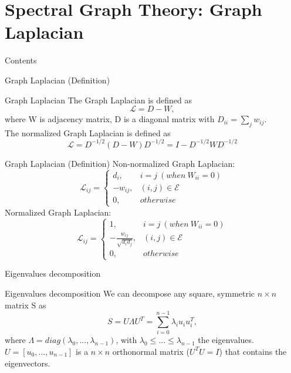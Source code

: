 \documentclass{beamer}
\begin{document}
	\section[Graph Laplacian]{Spectral Graph Theory: Graph Laplacian}
		\begin{frame}{Contents}
			\small
	\end{frame}
	\begin{frame}{Graph Laplacian (Definition)}
		\begin{block}{Graph Laplacian}
			The Graph Laplacian is defined as
			\[
			\mathcal{L}= D-W,
			\]
			where W is adjacency matrix, D is a diagonal matrix with $D_{ii} = \sum_{j}w_{ij}$. \\
			The normalized Graph Laplacian is defined as
			\[
			\mathcal{L} = D^{-1/2}(D-W)D^{-1/2} = I - D^{-1/2}WD^{-1/2}
			\]
		\end{block}
	\end{frame}
	\begin{frame}{Graph Laplacian (Definition)}
		Non-normalized Graph Laplacian:
		\begin{equation*}
			\mathcal{L}_{ij}=\begin{cases}
				d_i, & i=j\ (when\ W_{ii} = 0)\\
				-w_{ij}, & (i,j) \in \mathcal{E} \\
				0, &otherwise
			\end{cases}
		\end{equation*}
		Normalized Graph Laplacian:
		\begin{equation*}
			\mathcal{L}_{ij}=\begin{cases}
				1, & i=j\ (when\ W_{ii} = 0) \\
				-\frac{w_{ij}}{\sqrt{d_id_j}}, & (i,j) \in \mathcal{E} \\
				0, &otherwise
			\end{cases}
		\end{equation*}
	\end{frame}
	\begin{frame}{Eigenvalues decomposition}
		\begin{block}{Eigenvalues decomposition}
		We can decompose any square, symmetric $n\times n$ matrix S as
		\[
		S=U\Lambda U^T=\sum_{i=0}^{n-1}\lambda_iu_iu_i^T,
		\]
		where $\Lambda=diag(\lambda_0,...,\lambda_{n-1})$, with $\lambda_0\leq...\leq\lambda_{n-1}$ the eigenvalues. $U=[u_0,...,u_{n-1}]$ is a $n \times n$ orthonormal matrix ($U^TU=I$) that contains the eigenvectors.
		\end{block}
	\end{frame}
\end{document}
